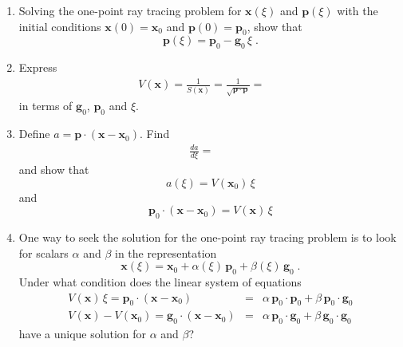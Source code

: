 \begin{enumerate}
\begin{enumerate}
\item Solving the one-point ray tracing problem for $\mathbf{x}(\xi)$
and $\mathbf{p}(\xi)$ with the initial conditions  $\mathbf{x}(0)=\mathbf{x}_0$ and
 $\mathbf{p}(0)=\mathbf{p}_0$, show that
\begin{equation}
\label{eq:psol}
\mathbf{p}(\xi) = \mathbf{p}_0 - \mathbf{g}_0\,\xi\;.
\end{equation}
\item Express
\begin{eqnarray}
\label{eq:vsol}
V(\mathbf{x}) = \frac{1}{S(\mathbf{x})} = \frac{1}{\sqrt{\mathbf{p} \cdot \mathbf{p}}} = & &
\end{eqnarray}
in terms of $\mathbf{g}_0$, $\mathbf{p}_0$ and $\xi$.
\item Define $a = \mathbf{p} \cdot (\mathbf{x} - \mathbf{x}_0)$. Find
\begin{eqnarray}
\label{eq:axi}
\frac{d a}{d \xi} = & & 
\end{eqnarray}
and show that 
\begin{equation}
\label{eq:asol}
a(\xi) = V(\mathbf{x}_0)\,\xi
\end{equation}
and
\begin{equation}
\label{eq:a0sol}
\mathbf{p}_0 \cdot (\mathbf{x} - \mathbf{x}_0) = V(\mathbf{x})\,\xi
\end{equation}
\item One way to seek the solution for the one-point ray tracing
  problem is to look for scalars $\alpha$ and $\beta$ in the representation
\begin{equation}
  \label{eq:xsol}
  \mathbf{x}(\xi) = \mathbf{x}_0 + \alpha(\xi)\,\mathbf{p}_0 + \beta(\xi)\,\mathbf{g}_0\;.
\end{equation}
Under what condition does the linear system of equations
\begin{eqnarray}
  \label{eq:linsys1}
  V(\mathbf{x})\,\xi = \mathbf{p}_0 \cdot (\mathbf{x} - \mathbf{x}_0) & = & 
  \alpha\,\mathbf{p}_0 \cdot \mathbf{p}_0 + \beta\,\mathbf{p}_0 \cdot \mathbf{g}_0 \\
  \label{eq:linsys2}
  V(\mathbf{x}) - V(\mathbf{x}_0) = \mathbf{g}_0 \cdot (\mathbf{x} - \mathbf{x}_0) & = &
  \alpha\,\mathbf{p}_0 \cdot \mathbf{g}_0 + \beta\,\mathbf{g}_0 \cdot \mathbf{g}_0
\end{eqnarray}
have a unique solution for $\alpha$ and $\beta$?
\end{enumerate}

\newpage


\end{enumerate}
